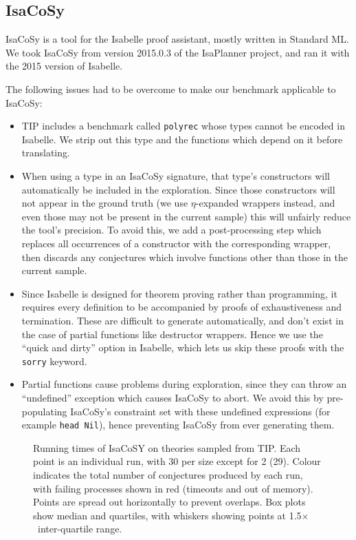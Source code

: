 \subsection{IsaCoSy}

IsaCoSy is a tool for the Isabelle proof assistant, mostly written in Standard
ML. We took IsaCoSy from version 2015.0.3 of the IsaPlanner project, and ran it
with the 2015 version of Isabelle.

The following issues had to be overcome to make our benchmark applicable to
IsaCoSy:

\begin{itemize}
\item TIP includes a benchmark called \texttt{polyrec} whose types cannot be
  encoded in Isabelle. We strip out this type and the functions which depend on
  it before translating.
\item When using a type in an IsaCoSy signature, that type's constructors will
  automatically be included in the exploration. Since those constructors will
  not appear in the ground truth (we use $\eta$-expanded wrappers instead, and
  even those may not be present in the current sample) this will unfairly reduce
  the tool's precision. To avoid this, we add a post-processing step which
  replaces all occurrences of a constructor with the corresponding wrapper, then
  discards any conjectures which involve functions other than those in the
  current sample.
\item Since Isabelle is designed for theorem proving rather than programming, it
  requires every definition to be accompanied by proofs of exhaustiveness and
  termination. These are difficult to generate automatically, and don't exist in
  the case of partial functions like destructor wrappers. Hence we use the
  ``quick and dirty'' option in Isabelle, which lets us skip these proofs with
  the \texttt{sorry} keyword.
\item Partial functions cause problems during exploration, since they can throw
  an ``undefined'' exception which causes IsaCoSy to abort. We avoid this by
  pre-populating IsaCoSy's constraint set with these undefined expressions
  (for example \texttt{head Nil}), hence preventing IsaCoSy from ever generating
  them.
\end{itemize}

\begin{figure}
  \centering
  
  \caption{Running times of IsaCoSY on theories sampled from TIP. Each point
    is an individual run, with 30 per size except for 2 (29). Colour indicates
    the total number of conjectures produced by each run, with failing processes
    shown in red (timeouts and out of memory). Points are spread out
    horizontally to prevent overlaps. Box plots show median and quartiles, with
    whiskers showing points at 1.5$\times$~inter-quartile range.}
  \label{figure:isacosy_runtimes}
\end{figure}


